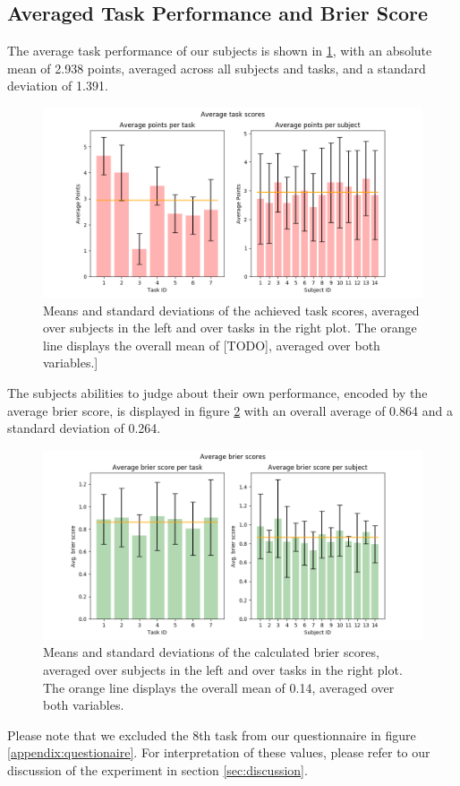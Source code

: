 \documentclass[../main/main.tex]{subfiles}
\begin{document}
\subsection{Averaged Task Performance and Brier Score}
The average task performance of our subjects is shown in \ref{fig:avg_scores}, with an absolute mean of 2.938 points, averaged across all subjects and tasks, and a standard deviation of 1.391.
\begin{figure}[H]
	\centering
	\captionsetup{justification=centering}
	\includegraphics[width=\textwidth]{../assets/average_task_scores.png}
	\caption{Means and standard deviations of the achieved task scores, averaged over subjects in the left and over tasks in the right plot. The orange line displays the overall mean of [TODO], averaged over both variables.]}
	\label{fig:avg_scores}
\end{figure}
The subjects abilities to judge about their own performance, encoded by the average brier score, is displayed in figure \ref{fig:avg_brier} with an overall average of 0.864 and a standard deviation of 0.264. 
\begin{figure}[H]
	\centering
	\captionsetup{justification=centering}
	\includegraphics[width=\textwidth]{../assets/average_brier_scores.png}
	\caption{Means and standard deviations of the calculated brier scores, averaged over subjects in the left and over tasks in the right plot. The orange line displays the overall mean of 0.14, averaged over both variables.}
	\label{fig:avg_brier} 
\end{figure}
Please note that we excluded the 8th task from our questionnaire in figure \ref{appendix:questionaire}. For interpretation of these values, please refer to our discussion of the experiment in section \ref{sec:discussion}.
\end{document}
